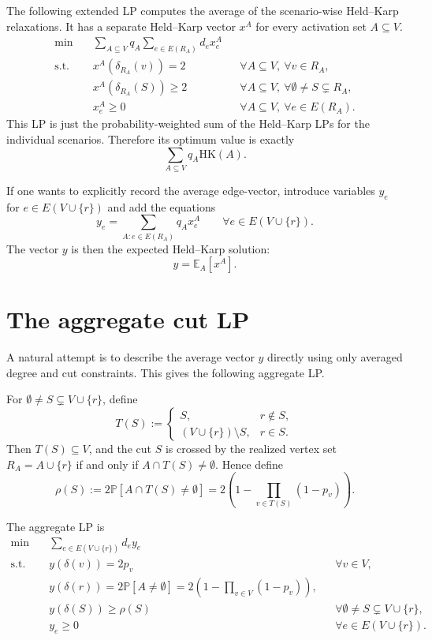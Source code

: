 \documentclass[11pt]{article}
\newcommand{\E}{\mathbb{E}}
\newcommand{\Prb}{\mathbb{P}}
\newcommand{\HK}{\mathrm{HK}}
\begin{document}
The following extended LP computes the average of the scenario-wise Held--Karp relaxations. It has a separate Held--Karp vector $x^A$ for every activation set $A\subseteq V$.
\[
\begin{aligned}
\min \quad
& \sum_{A\subseteq V} q_A \sum_{e\in E(R_A)} d_e x^A_e \\
\text{s.t.}\quad
& x^A(\delta_{R_A}(v)) = 2
&& \forall A\subseteq V,\ \forall v\in R_A, \\
& x^A(\delta_{R_A}(S)) \ge 2
&& \forall A\subseteq V,\ \forall \emptyset\neq S\subsetneq R_A, \\
& x^A_e\ge 0
&& \forall A\subseteq V,\ \forall e\in E(R_A).
\end{aligned}
\tag{SCEN}
\]
This LP is just the probability-weighted sum of the Held--Karp LPs for the individual scenarios. Therefore its optimum value is exactly
\[
\sum_{A\subseteq V}q_A\HK(A).
\]

If one wants to explicitly record the average edge-vector, introduce variables $y_e$ for $e\in E(V\cup\{r\})$ and add the equations
\[
y_e=\sum_{A:e\in E(R_A)}q_A x^A_e
\qquad \forall e\in E(V\cup\{r\}).
\]
The vector $y$ is then the expected Held--Karp solution:
\[
y=\E_A[x^A].
\]

\section{The aggregate cut LP}

A natural attempt is to describe the average vector $y$ directly using only averaged degree and cut constraints. This gives the following aggregate LP.

For $\emptyset\neq S\subsetneq V\cup\{r\}$, define
\[
T(S):=
\begin{cases}
S, & r\notin S,\\
(V\cup\{r\})\setminus S, & r\in S.
\end{cases}
\]
Then $T(S)\subseteq V$, and the cut $S$ is crossed by the realized vertex set $R_A=A\cup\{r\}$ if and only if $A\cap T(S)\neq\emptyset$. Hence define
\[
\rho(S):=2\Prb[A\cap T(S)\neq\emptyset]
=2\left(1-\prod_{v\in T(S)}(1-p_v)\right).
\]

The aggregate LP is
\[
\begin{aligned}
\min \quad
& \sum_{e\in E(V\cup\{r\})} d_e y_e \\
\text{s.t.}\quad
& y(\delta(v))=2p_v
&& \forall v\in V, \\
& y(\delta(r))=2\Prb[A\neq\emptyset]
=2\left(1-\prod_{v\in V}(1-p_v)\right), \\
& y(\delta(S))\ge \rho(S)
&& \forall \emptyset\neq S\subsetneq V\cup\{r\}, \\
& y_e\ge 0
&& \forall e\in E(V\cup\{r\}).
\end{aligned}
\tag{AGG}
\]
\end{document}
